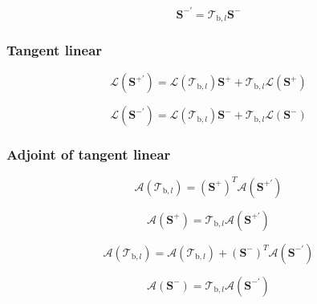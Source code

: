 \begin{equation}
\mathbf{S}^{-\prime} = \mathcal{T}_{\mathrm{b},l} \mathbf{S}^{-}
\label{eq:solar_source-scale_global_solar_source-forward-F_m_prime}
\end{equation}


%
\subsubsection{Tangent linear}
\label{sec:solar_source-scale_global_solar_source-tangent_linear}

\begin{equation}
\mathcal{L}(\mathbf{S}^{+\prime}) = \mathcal{L}(\mathcal{T}_{\mathrm{b},l}) \mathbf{S}^{+} + \mathcal{T}_{\mathrm{b},l} \mathcal{L}(\mathbf{S}^{+})
\label{eq:solar_source-scale_global_solar_source-tangent_linear-F_p_prime}
\end{equation}

\begin{equation}
\mathcal{L}(\mathbf{S}^{-\prime}) = \mathcal{L}(\mathcal{T}_{\mathrm{b},l}) \mathbf{S}^{-} + \mathcal{T}_{\mathrm{b},l} \mathcal{L}(\mathbf{S}^{-})
\label{eq:solar_source-scale_global_solar_source-tangent_linear-F_m_prime}
\end{equation}


%
\subsubsection{Adjoint of tangent linear}
\label{sec:solar_source-scale_global_solar_source-adjoint_of_tangent_linear}

\begin{equation}
\mathcal{A}(\mathcal{T}_{\mathrm{b},l}) = (\mathbf{S}^{+})^{T}\mathcal{A}(\mathbf{S}^{+\prime})
\label{eq:solar_source-scale_global_solar_source-adjoint_of_tangent_linear-t_a}
\end{equation}

\begin{equation}
\mathcal{A}(\mathbf{S}^{+}) = \mathcal{T}_{\mathrm{b},l}\mathcal{A}(\mathbf{S}^{+\prime})
\label{eq:solar_source-scale_global_solar_source-adjoint_of_tangent_linear-F_p_a}
\end{equation}

\begin{equation}
\mathcal{A}(\mathcal{T}_{\mathrm{b},l}) = \mathcal{A}(\mathcal{T}_{\mathrm{b},l}) + (\mathbf{S}^{-})^{T}\mathcal{A}(\mathbf{S}^{-\prime})
\label{eq:solar_source-scale_global_solar_source-adjoint_of_tangent_linear-t_a2}
\end{equation}

\begin{equation}
\mathcal{A}(\mathbf{S}^{-}) = \mathcal{T}_{\mathrm{b},l}\mathcal{A}(\mathbf{S}^{-\prime})
\label{eq:solar_source-scale_global_solar_source-adjoint_of_tangent_linear-F_m_a}
\end{equation}
